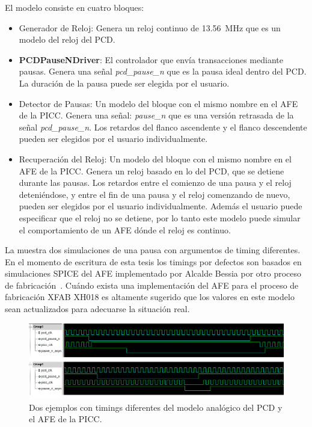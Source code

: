 \documentclass[a4paper, twoside, 11pt]{report}
\begin{document}
El modelo consiste en cuatro bloques:

\begin{itemize}
  \item Generador de Reloj: Genera un reloj continuo de \SI{13.56}{\mega\hertz} que es un modelo del reloj del PCD.
  \item \textbf{PCDPauseNDriver}: El controlador que envía transacciones mediante pausas. Genera una señal \textit{pcd\_pause\_n} que es la pausa ideal dentro del PCD. La duración de la pausa puede ser elegida por el usuario.
  \item Detector de Pausas: Un modelo del bloque con el mismo nombre en el AFE de la PICC. Genera una señal: \textit{pause\_n} que es una versión retrasada de la señal \textit{pcd\_pause\_n}. Los retardos del flanco ascendente y el flanco descendente pueden ser elegidos por el usuario individualmente.
  \item Recuperación del Reloj: Un modelo del bloque con el mismo nombre en el AFE de la PICC. Genera un reloj basado en lo del PCD, que se detiene durante las pausas. Los retardos entre el comienzo de una pausa y el reloj deteniéndose, y entre el fin de una pausa y el reloj comenzando de nuevo, pueden ser elegidos por el usuario individualmente. Además el usuario puede especificar que el reloj no se detiene, por lo tanto este modelo puede simular el comportamiento de un AFE dónde el reloj es continuo.
\end{itemize}

La  muestra dos simulaciones de una pausa con argumentos de timing diferentes. En el momento de escritura de esta tesis los timings por defectos son basados en simulaciones SPICE del AFE implementado por Alcalde Bessia por otro proceso de fabricación~\cite{fabricio_eamta}. Cuándo exista una implementación del AFE para el proceso de fabricación XFAB XH018 es altamente sugerido que los valores en este modelo sean actualizados para adecuarse la situación real.

\begin{figure}[htb]
  \centering
  \includegraphics[width=1.0\textwidth]{./img/analogue_sim}
  \caption{Dos ejemplos con timings diferentes del modelo analógico del PCD y el AFE de la PICC.}
  \label{fig:afe_sim}
\end{figure}
\end{document}
